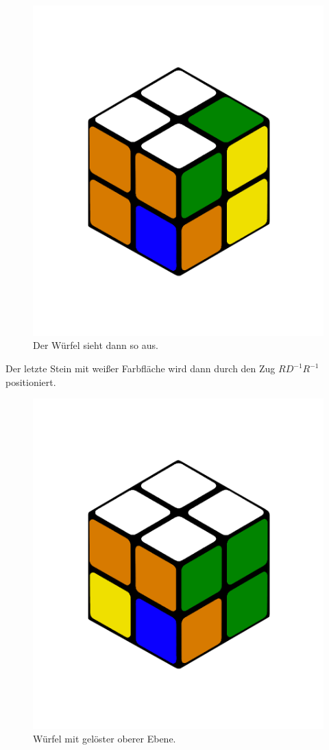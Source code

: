 \documentclass[12pt,a4paper, usenames, dvipsnames]{article}
\begin{document}
\begin{figure}[H]
\centering
\includegraphics[scale=0.12]{menschSchritt2.png}
\caption[Lösung von Mensch: Schritt 2]{Der Würfel sieht dann so aus.}
\end{figure}
Der letzte Stein mit weißer Farbfläche wird dann durch den Zug $RD^{-1}R^{-1}$ positioniert. 
\begin{figure}[H]
\centering
\includegraphics[scale=0.12]{menschSchritt3.png}
\caption[Lösung von Mensch: Schritt 3]{Würfel mit gelöster oberer Ebene.}
\end{figure}
\end{document}
